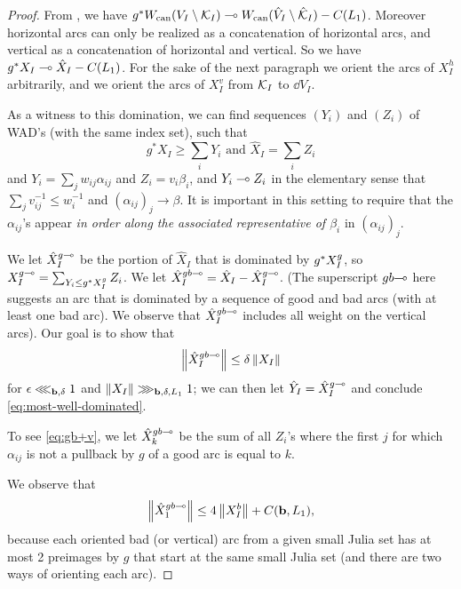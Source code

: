 \begin{proof}
From \cite{K06},
we have $g^*W_{\operatorname{can}}(V_I \setminus \mathcal K_I)\multimap W_{\operatorname{can}}(\hat V_I \setminus \hat{\mathcal K}_I) - C(L_1)$.
Moreover horizontal arcs can only be realized as a concatenation of horizontal arcs,
and vertical as a concatenation of horizontal and vertical. 
So we have
$g^*X_I \multimap \hat X_I - C(L_1)$. 
For the sake of the next paragraph we orient the arcs of $X^h_I$ arbitrarily,
and we orient the arcs of $X^v_I$ from $\mathcal K_I$ to $\dd V_I$. 

As a witness to this domination,
we can find sequences $(Y_i)$ and $(Z_i)$ of WAD's (with the same index set), such that
\begin{equation} \label{eq:witness}
g^*X_I \ge \sum_i Y_i \text{ and } \hat X_I = \sum_i Z_i
\end{equation}
and $Y_i = \sum_j w_{ij} \alpha_{ij}$ and $Z_i = v_i \beta_i$,
and $Y_i \multimap Z_i$ in the elementary sense that $\sum_j v_{ij}^{-1} \le w_i^{-1}$ and $(\alpha_{ij})_j \to \beta$. 
It is important in this setting to require that the $\alpha_{ij}$'s appear 
\emph{in order along the associated representative of $\beta_i$} in $(\alpha_{ij})_j$.

We let $\hat X^{g\multimap}_I$ be the portion of $\hat X_I$ that is dominated by $g^*X^g_I$,
so $X^{g\multimap}_I = \sum_{Y_i \le g^*{X^g_I}} Z_i$. 
We let $\hat X^{gb\multimap}_I = \hat X_I - \hat X^{g\multimap}_I$. 
(The superscript $gb\kern-3pt\multimap$ here suggests an arc that is dominated by a sequence of good and bad arcs (with at least one bad arc). 
We observe that $\hat X^{gb\multimap}_I$ includes all weight on the vertical arcs).  
Our goal is to show that 
\begin{equation} \label{eq:gb+v}
\left\Vert \hat X^{gb\multimap}_I \right\Vert \le \delta \left\Vert X_I \right\Vert
\end{equation}
for $\epsilon \lll_{\mathbf b, \delta} 1$ and $\left\Vert X_I \right\Vert \ggg_{\mathbf b, \delta, L_1} 1$;
we can then let $\hat Y_I = \hat X^{g\multimap}_I$ and conclude \eqref{eq:most-well-dominated}.

To see \eqref{eq:gb+v},
we let $\hat X^{gb\multimap}_k$ be the sum of all $Z_i$'s where the first $j$ for which $\alpha_{ij}$ is not a pullback by $g$ of a good arc is equal to $k$. 

We observe that 
\begin{equation} \label{eq:kis1}
\left\Vert \hat X^{gb\multimap}_1 \right\Vert \le 4 \left\Vert X_I^{b} \right\Vert + C(\mathbf b , L_1),
\end{equation} 
because each oriented bad (or vertical) arc from a given small Julia set has at most 2 preimages by $g$ that start at the same small Julia set (and there are two ways of orienting each arc). 


\end{proof}
